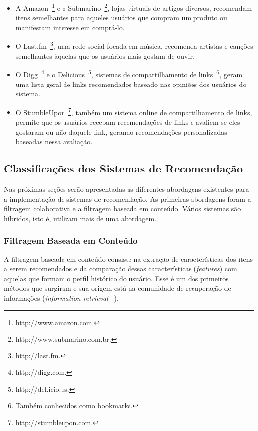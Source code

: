 \begin{itemize}
\item 
A Amazon~\footnote{http://www.amazon.com.} e o Submarino~\footnote{http://www.submarino.com.br.}, lojas virtuais de artigos diversos, recomendam itens semelhantes para aqueles usuários que compram um produto ou manifestam interesse em comprá-lo.

\item O Last.fm~\footnote{http://last.fm.}, uma rede social focada em música, recomenda artistas e canções semelhantes àquelas que os usuários mais gostam de ouvir.

\item O Digg~\footnote{http://digg.com.} e o Delicious~\footnote{http://del.icio.us.}, sistemas de compartilhamento de links~\footnote{Também conhecidos como bookmarks.}, geram uma lista geral de links recomendados baseado nas opiniões dos usuários do sistema.

\item O StumbleUpon~\footnote{http://stumbleupon.com.}, também um sistema online de compartilhamento de links, permite que os usuários recebam recomendações de links e avaliem se eles gostaram ou não daquele link, gerando recomendações personalizadas baseadas nessa avaliação.
\end{itemize}


\subsection{Classificações dos Sistemas de Recomendação}

Nas próximas seções serão apresentadas as diferentes abordagens existentes para a implementação de sistemas de recomendação. As primeiras abordagens foram a filtragem colaborativa e a filtragem baseada em conteúdo. Vários sistemas são híbridos, isto é, utilizam mais de uma abordagem.


\subsubsection{Filtragem Baseada em Conteúdo} %
A filtragem baseada em conteúdo consiste na extração de características dos itens a serem recomendados e da comparação dessas características (\textit{features}) com aquelas que formam o  perfil histórico do usuário. Esse é um dos primeiros métodos que surgiram e sua origem está na comunidade de recuperação de informações (\textit{information retrieval} ~\cite{Balabanovi97}).


